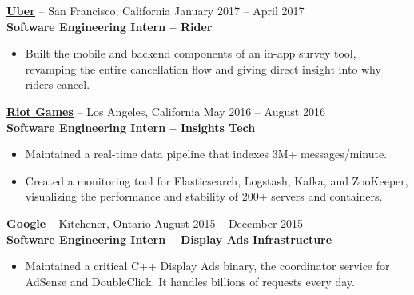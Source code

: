 \documentclass{letter}
\begin{document}
\vspace{-1.5mm}
{\bfseries \href{http://uber.com}{\uline{Uber}}} -- San Francisco,
California \hfill January 2017 -- April 2017\\
{\bfseries Software Engineering Intern -- Rider}
\vspace{-3mm}
\begin{itemize}
    \item Built the mobile and backend components of an in-app survey tool,
      revamping the entire cancellation flow and giving direct insight into
      why riders cancel.
\end{itemize}

\vspace{-1.5mm}
{\bfseries \href{http://riotgames.com}{\uline{Riot Games}}} -- Los Angeles,
California \hfill May 2016 -- August 2016\\
{\bfseries Software Engineering Intern -- Insights Tech}
\vspace{-3mm}
\begin{itemize}
    \item Maintained a real-time data pipeline that indexes 3M+ messages/minute.
    \item Created a monitoring tool for Elasticsearch, Logstash, Kafka, and
      ZooKeeper, visualizing the performance and stability of 200+ servers and
      containers.
\end{itemize}

\vspace{-1.5mm}
{\bfseries \href{https://www.google.com}{\uline{Google}}} -- Kitchener, Ontario \hfill August 2015 -- December 2015\\
{\bfseries Software Engineering Intern -- Display Ads Infrastructure}
\vspace{-3mm}
\begin{itemize}
    \item Maintained a critical C++ Display Ads binary, the coordinator service
      for AdSense and DoubleClick. It handles billions of requests every day.
\end{itemize}
\end{document}
